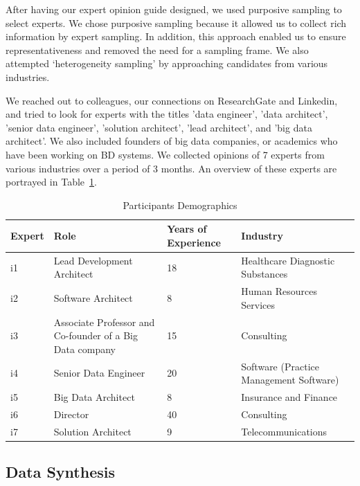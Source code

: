\documentclass{bmcart}
\begin{document}
After having our expert opinion guide designed, we used purposive sampling \cite{baltes2022sampling} to select experts. We chose purposive sampling because it allowed us to collect rich information by expert sampling. In addition, this approach enabled us to ensure representativeness and removed the need for a sampling frame. We also attempted `heterogeneity sampling' by approaching candidates from various industries. 

We reached out to colleagues, our connections on ResearchGate and Linkedin, and tried to look for experts with the titles 'data engineer', 'data architect', 'senior data engineer', 'solution architect', 'lead architect', and 'big data architect'. We also included founders of big data companies, or academics who have been working on BD systems. We collected opinions of 7 experts from various industries over a period of 3 months. An overview of these experts are portrayed in Table~\ref{interviewees}. 


\begin{table}[h]
  \renewcommand{\arraystretch}{1.5}
  \caption[]{Participants Demographics}
  \begin{tabular}{|p{1.4cm}|p{4cm}|p{1.5cm}|p{2.5cm}|}
      \hline
      Expert & Role & Years of Experience  & Industry \\  

      \hline
      i1 & Lead Development Architect & 18 &  Healthcare Diagnostic Substances \\   
      \hline
      i2 & Software Architect & 8 &  Human Resources Services  \\   
      \hline
      i3 & Associate Professor and Co-founder of a Big Data company & 15 &  Consulting \\   
      \hline
      i4 & Senior Data Engineer & 20 &  Software (Practice Management Software) \\   
      \hline
      i5 & Big Data Architect & 8 &  Insurance and Finance \\   
      \hline
      i6 & Director & 40 &  Consulting \\   
      \hline
      i7 & Solution Architect & 9 &  Telecommunications \\   
      \hline
      
  \end{tabular}
  \label{interviewees}
\end{table}


\subsection{Data Synthesis}
\end{document}
